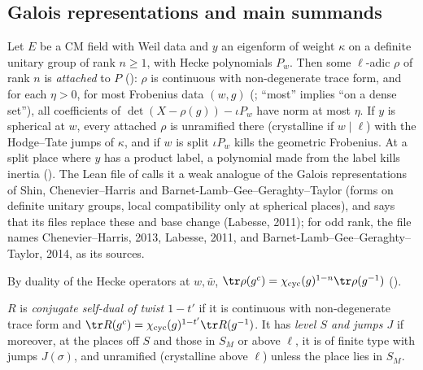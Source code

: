 \subsection{Galois representations and main summands}\label{cg-selmer:sec:galois}

\begin{fact}\label{cg-selmer:fact:galois}
Let $E$ be a CM field with Weil data and $y$ an eigenform of weight $\kappa$ on a definite unitary
group of rank $n\ge1$, with Hecke polynomials $P_w$. Then some $\ell$-adic $\rho$ of rank $n$ is
\emph{attached} to $P$ (): $\rho$ is continuous with non-degenerate
trace form, and for each $\eta>0$, for most Frobenius data $(w,g)$ (; ``most''
implies ``on a dense set''), all coefficients of $\det(X-\rho(g))-\iota P_w$ have norm at most $\eta$.
If $y$ is spherical at $w$, every attached $\rho$ is unramified there (crystalline if $w\mid\ell$)
with the Hodge--Tate jumps of $\kappa$, and if $w$ is split $\iota P_w$ kills the geometric Frobenius.
At a split place where $y$ has a product label, a polynomial made from the label kills inertia
().
The Lean file of  calls it a weak analogue of the Galois
representations of Shin, Chenevier--Harris and Barnet-Lamb--Gee--Geraghty--Taylor (forms on definite
unitary groups, local compatibility only at spherical places), and says that its files replace these
and base change (Labesse, 2011); for odd rank, the file  names
Chenevier--Harris, 2013, Labesse, 2011, and Barnet-Lamb--Gee--Geraghty--Taylor, 2014, as its sources.
\end{fact}

By duality of the Hecke operators at $w,\bar w$,
$\tr\rho(g^c)=\chi_{\mathrm{cyc}}(g)^{1-n}\tr\rho(g^{-1})$ ().

\begin{definition}\label{cg-selmer:def:csd}
$R$ is \emph{conjugate self-dual of twist $1-t'$} if it is continuous with non-degenerate trace form
and $\tr R(g^c)=\chi_{\mathrm{cyc}}(g)^{1-t'}\tr R(g^{-1})$. It has \emph{level $S$ and jumps $J$} if moreover, at
the places off $S$ and those in $S_M$ or above $\ell$, it is of finite type with jumps $J(\sigma)$,
and unramified (crystalline above $\ell$) unless the place lies in $S_M$.
\end{definition}

